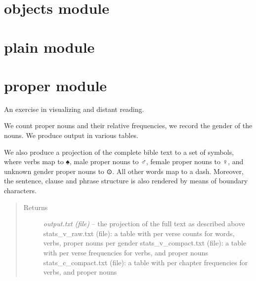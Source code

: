 \documentclass[letterpaper,10pt,english]{sphinxmanual}
\begin{document}
\section{objects module}
\label{tasks/objects:module-objects}\label{tasks/objects:objects-module}\label{tasks/objects::doc}

\begin{fulllineitems}
\label{tasks/objects:objects.task}
\end{fulllineitems}



\section{plain module}
\label{tasks/plain:plain-module}\label{tasks/plain::doc}\label{tasks/plain:module-plain}

\begin{fulllineitems}
\label{tasks/plain:plain.task}
\end{fulllineitems}



\section{proper module}
\label{tasks/proper:module-proper}\label{tasks/proper::doc}\label{tasks/proper:proper-module}

\begin{fulllineitems}
\label{tasks/proper:proper.task}
An exercise in visualizing and distant reading.

We count proper nouns and their relative frequencies, we record the gender of the nouns.
We produce output in various tables.

We also produce a projection of the complete bible text to a set of symbols,
where verbs map to ♠, male proper nouns to ♂,
female proper nouns to ♀, and unknown gender proper nouns to ⊙.
All other words map to a dash. Moreover, the sentence, clause and phrase
structure is also rendered by means of boundary characters.
\begin{quote}\begin{description}
\item[{Returns}] \leavevmode
\emph{output.txt (file)} --
the projection of the full text as described above
stats\_v\_raw.txt (file): a table with per verse counts for words, verbs, proper nouns per gender
stats\_v\_compact.txt (file): a table with per verse frequencies for verbs, and proper nouns
stats\_c\_compact.txt (file): a table with per chapter frequencies for verbs, and proper nouns

\end{description}\end{quote}

\end{fulllineitems}
\end{document}
